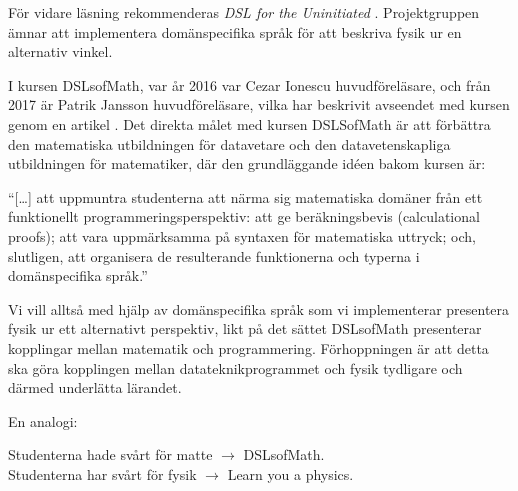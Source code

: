 \begin{draft}
För vidare läsning
rekommenderas \textit{DSL for the Uninitiated} \cite{DSLU}. Projektgruppen ämnar att implementera
domänspecifika språk för att beskriva fysik ur en alternativ vinkel.

I kursen DSLsofMath, var år 2016 var Cezar Ionescu huvudföreläsare, och från 2017 är Patrik Jansson
huvudföreläsare, vilka har beskrivit avseendet med kursen genom en artikel \cite{tfpie2015}. Det direkta målet
med kursen DSLSofMath är att förbättra den matematiska utbildningen för datavetare och den
datavetenskapliga utbildningen för matematiker, där den grundläggande idéen bakom kursen är:

\begin{center}
  ``[\dots] att uppmuntra studenterna att närma sig matematiska domäner från ett
  funktionellt programmeringsperspektiv: att ge beräkningsbevis (calculational
  proofs); att vara uppmärksamma på syntaxen för matematiska uttryck; och,
  slutligen, att organisera de resulterande funktionerna och typerna i
  domänspecifika språk.''\cite{lecture-notes}\cite{tfpie2015}
\end{center}

Vi vill alltså med hjälp av domänspecifika språk som vi implementerar presentera fysik ur ett alternativt perspektiv, likt
på det sättet DSLsofMath presenterar kopplingar mellan matematik och programmering. Förhoppningen är att detta ska göra kopplingen mellan datateknikprogrammet och fysik tydligare och därmed underlätta lärandet.


En analogi:

Studenterna hade svårt för matte $\rightarrow $ DSLsofMath.\\
Studenterna har svårt för fysik $\rightarrow $ Learn you a physics.



\end{draft}

